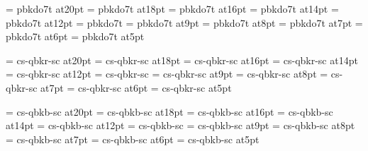 \font\twentyslbf=      pbkdo7t at20pt
\font\eighteenslbf=    pbkdo7t at18pt
\font\sixteenslbf=     pbkdo7t at16pt
\font\fourteenslbf=    pbkdo7t at14pt
\font\twelveslbf=      pbkdo7t at12pt
\font\slbf=            pbkdo7t
\font\nineslbf=        pbkdo7t at9pt
\font\eightslbf=       pbkdo7t at8pt
\font\sevenslbf=       pbkdo7t at7pt
\font\sixslbf=         pbkdo7t at6pt
\font\fiveslbf=        pbkdo7t at5pt

\font\twentycaps=      cs-qbkr-sc at20pt
\font\eighteencaps=    cs-qbkr-sc at18pt
\font\sixteencaps=     cs-qbkr-sc at16pt
\font\fourteencaps=    cs-qbkr-sc at14pt
\font\twelvecaps=      cs-qbkr-sc at12pt
\font\caps=            cs-qbkr-sc
\font\ninecaps=        cs-qbkr-sc at9pt
\font\eightcaps=       cs-qbkr-sc at8pt
\font\sevencaps=       cs-qbkr-sc at7pt
\font\sixcaps=         cs-qbkr-sc at6pt
\font\fivecaps=        cs-qbkr-sc at5pt

\font\twentycapsbf=      cs-qbkb-sc at20pt
\font\eighteencapsbf=    cs-qbkb-sc at18pt
\font\sixteencapsbf=     cs-qbkb-sc at16pt
\font\fourteencapsbf=    cs-qbkb-sc at14pt
\font\twelvecapsbf=      cs-qbkb-sc at12pt
\font\capsbf=            cs-qbkb-sc
\font\ninecapsbf=        cs-qbkb-sc at9pt
\font\eightcapsbf=       cs-qbkb-sc at8pt
\font\sevencapsbf=       cs-qbkb-sc at7pt
\font\sixcapsbf=         cs-qbkb-sc at6pt
\font\fivecapsbf=        cs-qbkb-sc at5pt

\rm 
